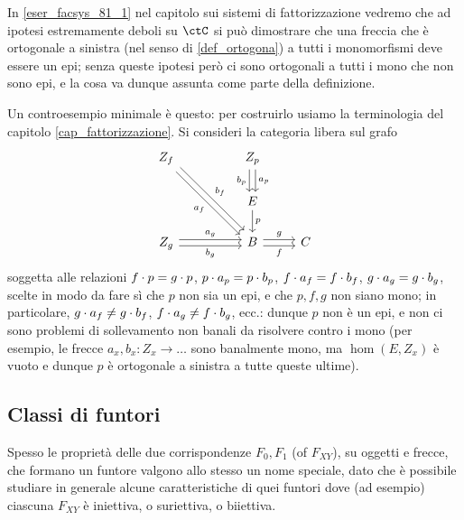 \begin{remark}\label{strepi_not_epi}
 In \ref{eser_facsys_81_1} nel capitolo sui sistemi di fattorizzazione vedremo che ad ipotesi estremamente deboli su \(\ctC\) si può dimostrare che una freccia che è ortogonale a sinistra (nel senso di \ref{def_ortogona}) a tutti i monomorfismi deve essere un epi; senza queste ipotesi però ci sono ortogonali a tutti i mono che non sono epi, e la cosa va dunque assunta come parte della definizione.

 Un controesempio minimale è questo: per costruirlo usiamo la terminologia del capitolo \ref{cap_fattorizzazione}. Si consideri la categoria libera sul grafo
 \[\begin{tikzcd}[ampersand replacement=\&]
   {Z_f} \&\& {Z_p} \\
   \&\& E \\
   {Z_g} \&\& B \& C
   \arrow["{{b_f}}", shift left, from=1-1, to=3-3]
   \arrow["{{a_f}}"', shift right, from=1-1, to=3-3]
   \arrow["{{b_p}}"', shift right, from=1-3, to=2-3]
   \arrow["{{a_p}}", shift left, from=1-3, to=2-3]
   \arrow["p", from=2-3, to=3-3]
   \arrow["{{a_g}}", shift left, from=3-1, to=3-3]
   \arrow["{{b_g}}"', shift right, from=3-1, to=3-3]
   \arrow["f"', shift right, from=3-3, to=3-4]
   \arrow["g", shift left, from=3-3, to=3-4]
  \end{tikzcd}\]
 soggetta alle relazioni
 \(f\cdot p = g\cdot p\), \(p\cdot a_p = p\cdot b_p\), \(f\cdot a_f = f\cdot b_f\), \(g\cdot a_g = g\cdot b_g\),
 scelte in modo da fare sì che \(p\) non sia un epi, e che \(p,f,g\) non siano mono; in particolare,
 \(g\cdot a_f \ne g\cdot b_f\), \(f\cdot a_g \ne f\cdot b_g\), ecc.: dunque \(p\) non è un epi, e non ci sono problemi di sollevamento non banali da risolvere contro i mono (per esempio, le frecce \(a_x,b_x \colon Z_x \to \dots\) sono banalmente mono, ma \(\hom(E,Z_x)\) è vuoto e dunque \(p\) è ortogonale a sinistra a tutte queste ultime).
\end{remark}
\subsection{Classi di funtori}\label{ssec:classi_di_funtori}
Spesso le proprietà delle due corrispondenze \(F_0,F_1\) (of \(F_{XY}\)), su oggetti e frecce, che formano un funtore valgono allo stesso un nome speciale, dato che è possibile studiare in generale alcune caratteristiche di quei funtori dove (ad esempio) ciascuna \(F_{XY}\) è iniettiva, o suriettiva, o biiettiva.


